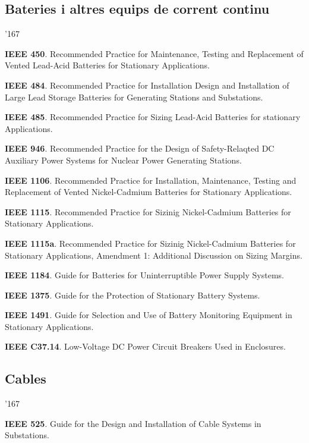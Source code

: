\subsection*{Bateries i altres equips de corrent continu}
\begin{dinglist}{'167}
    \item \textbf{IEEE 450}. Recommended Practice for  Maintenance, Testing and Replacement of Vented Lead-Acid Batteries for Stationary Applications.
    \item \textbf{IEEE 484}. Recommended Practice for Installation Design and Installation of Large Lead Storage Batteries for Generating Stations and Substations.
    \item \textbf{IEEE 485}. Recommended Practice for Sizing Lead-Acid Batteries for stationary Applications.
    \item \textbf{IEEE 946}. Recommended Practice for the Design of Safety-Relaqted DC Auxiliary Power Systems for Nuclear Power Generating Stations.
    \item \textbf{IEEE 1106}. Recommended Practice for Installation, Maintenance, Testing and Replacement of Vented Nickel-Cadmium Batteries for Stationary Applications.
    \item \textbf{IEEE 1115}. Recommended Practice for Sizinig Nickel-Cadmium Batteries for Stationary Applications.
    \item \textbf{IEEE 1115a}. Recommended Practice for Sizinig Nickel-Cadmium Batteries for Stationary Applications, Amendment 1: Additional Discussion on Sizing Margins.
    \item \textbf{IEEE 1184}. Guide for Batteries for Uninterruptible Power Supply Systems.
    \item \textbf{IEEE 1375}. Guide for the Protection of Stationary Battery Systems.
    \item \textbf{IEEE 1491}. Guide for Selection and Use of Battery Monitoring Equipment in Stationary Applications.
    \item \textbf{IEEE C37.14}. Low-Voltage DC Power Circuit Breakers Used in Enclosures.
\end{dinglist}


\subsection*{Cables}
\begin{dinglist}{'167}
    \item \textbf{IEEE 525}. Guide for the Design and Installation of Cable Systems in Substations.
\end{dinglist}

